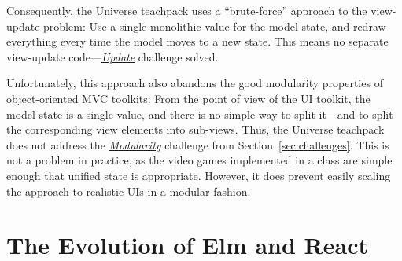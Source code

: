 \documentclass[sigplan,screen]{acmart}
\begin{document}
Consequently, the Universe teachpack uses a ``brute-force'' approach
to the view-update problem: Use a single monolithic value for the model
state, and redraw everything every time the model moves to a new
state.  This means no separate view-update code---\hyperlink{challenge:update}{\textit{Update}} challenge
solved.

Unfortunately, this approach also abandons the good modularity
properties of object-oriented MVC toolkits: From the point of view of
the UI toolkit, the model state is a single value, and there is no
simple way to split it---and to split the corresponding view elements into
sub-views.  Thus, the Universe
teachpack does not address the \hyperlink{challenge:modularity}{\textit{Modularity}} challenge from
Section~\ref{sec:challenges}.  This is not a
problem in practice, as the video games implemented in
a class are simple enough that unified state is appropriate.  However,
it does prevent easily scaling the approach to realistic UIs in a
modular fashion.

\section{The Evolution of Elm and React}
\label{sec:elm-react}
\end{document}
